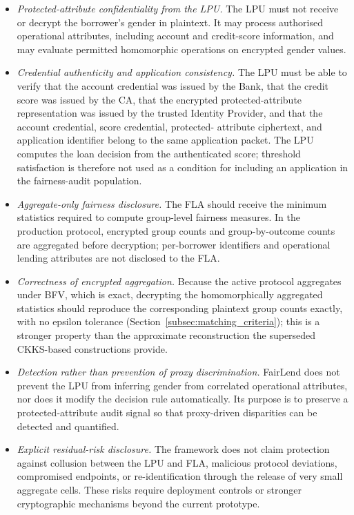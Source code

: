 \documentclass[a4paper,fleqn]{cas-dc}
\begin{document}
\begin{itemize} 
    \item \textit{Protected-attribute confidentiality from the LPU.} The LPU must not receive or decrypt the borrower's gender in plaintext. It may process authorised operational attributes, including account and credit-score information, and may evaluate permitted homomorphic operations on encrypted gender values. 
    \item \textit{Credential authenticity and application consistency.} The LPU must be able to verify that the account credential was issued by the Bank, that the credit score was issued by the CA, that the encrypted protected-attribute representation was issued by the trusted Identity Provider, and that the account credential, score credential, protected- attribute ciphertext, and application identifier belong to the same application packet. The LPU computes the loan decision from the authenticated score; threshold satisfaction is therefore not used as a condition for including an application in the fairness-audit population. 
    \item \textit{Aggregate-only fairness disclosure.} The FLA should receive the minimum statistics required to compute group-level fairness measures. In the production protocol, encrypted group counts and group-by-outcome counts are aggregated before decryption; per-borrower identifiers and operational lending attributes are not disclosed to the FLA. 
    \item \textit{Correctness of encrypted aggregation.} Because the active protocol aggregates under BFV, which is exact, decrypting the homomorphically aggregated statistics should reproduce the corresponding plaintext group counts exactly, with no epsilon tolerance (Section~\ref{subsec:matching_criteria}); this is a stronger property than the approximate reconstruction the superseded CKKS-based constructions provide.
    \item \textit{Detection rather than prevention of proxy discrimination.} FairLend does not prevent the LPU from inferring gender from correlated operational attributes, nor does it modify the decision rule automatically. Its purpose is to preserve a protected-attribute audit signal so that proxy-driven disparities can be detected and quantified. 
    \item \textit{Explicit residual-risk disclosure.} The framework does not claim protection against collusion between the LPU and FLA, malicious protocol deviations, compromised endpoints, or re-identification through the release of very small aggregate cells. These risks require deployment controls or stronger cryptographic mechanisms beyond the current prototype. 

\end{itemize}
\end{document}
